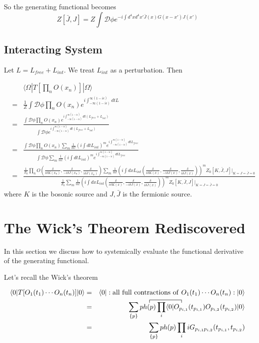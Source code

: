 \documentclass[12pt]{book}
\begin{document}
	So the generating functional becomes
	\begin{equation}
		Z[\bar J,J]=Z\int \mathcal D \phi e^{-i\int d^4xd^4x'\bar J(x)G(x-x')J(x')}
	\end{equation}
	
	\subsection{Interacting System}
	
	Let $L=L_{free}+L_{int}$. We treat $L_{int}$ as a perturbation. Then
	
	\begin{eqnarray}
		&&\langle \Omega|T[\prod_nO (x_n)]|\Omega\rangle\\
		&=&\frac 1Z\int \mathcal D \phi\prod_n O(x_n)e^{i\int_{-\infty(1-i\epsilon)}^{\infty(1-i\epsilon)}dtL}\\
		&=&\frac {\int \mathcal D \phi\prod_n O(x_n)e^{i\int_{-\infty(1-i\epsilon)}^{\infty(1-i\epsilon)}dt(L_{free}+L_{int})}}{\int \mathcal D \phi e^{i\int_{-\infty(1-i\epsilon)}^{\infty(1-i\epsilon)}dt(L_{free}+L_{int})}}\\
		&=&\frac {\int \mathcal D \phi\prod_n O(x_n)\sum_m\frac 1{m!}(i\int dt L_{int})^me^{i\int_{-\infty(1-i\epsilon)}^{\infty(1-i\epsilon)}dtL_{free}}}{\int \mathcal D \phi\sum_m\frac 1{m!}(i\int dt L_{int})^me^{i\int_{-\infty(1-i\epsilon)}^{\infty(1-i\epsilon)}dtL_{free}}}\\
		&=&\frac{\frac 1{Z_0}\prod_n O(\frac{\delta}{i\delta K(x_n)},\frac{\delta}{-i\delta J(x_n)},\frac{\delta}{i\delta \bar J(x_n)})\sum_m\frac 1{m!}(i\int dx L_{int}(\frac{\delta}{i\delta K(x)},\frac{\delta}{-i\delta J(x)},\frac{\delta}{i\delta \bar J(x)}))^mZ_0[K,\bar J,J]\Big|_{K=J=\bar J=0}}{\frac 1{Z_0}\sum_m\frac 1{m!}(i\int dx L_{int}(\frac{\delta}{i\delta K(x)},\frac{\delta}{-i\delta J(x)},\frac{\delta}{i\delta \bar J(x)}))^mZ_0[K,\bar J,J]\Big|_{K=J=\bar J=0}}
	\end{eqnarray}
	where $K$ is the bosonic source and $J,\bar J$ is the fermionic source.	
	\section{The Wick's Theorem Rediscovered}
	
	In this section we discuss how to systemically evaluate the functional derivative of the generating functional.
	
	Let's recall the Wick's theorem
	
	\begin{eqnarray}
		\langle 0|T[O_1(t_1)\cdots O_n(t_n)]|0\rangle &=&\langle 0|:{\rm all\ full\ contractions\ of\ }O_1(t_1)\cdots O_n(t_n):|0\rangle\\
		\contraction{\qquad\;  \sum_{\{p\}}ph(p)\prod_i\langle0|}{O}{{}_{p_{i,1}}(t_{p_{i,1}})}{O}
		&=&\sum_{\{p\}}ph(p)\prod_i \langle0|O_{p_{i,1}}(t_{p_{i,1}})O_{p_{i,2}}(t_{p_{i,2}})|0\rangle\\
		&=&\sum_{\{p\}}ph(p)\prod_i iG_{p_{i,1}p_{i,2}}(t_{p_{i,1}},t_{p_{i,2}})
	\end{eqnarray}
	
\end{document}
